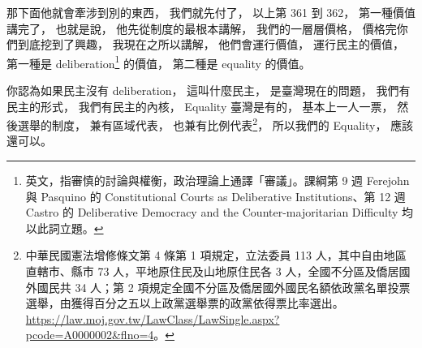 \hypertarget{w06:cue:1483}{}那下面他就會牽涉到別的東西，
\hypertarget{w06:cue:1484}{}我們就先付了，
\hypertarget{w06:cue:1485}{}以上第 361 到 362，
\hypertarget{w06:cue:1486}{}第一種價值講完了，
\hypertarget{w06:cue:1487}{}也就是說，
\hypertarget{w06:cue:1488}{}他先從制度的最根本講解，
\hypertarget{w06:cue:1489}{}我們的一層層價格，
\hypertarget{w06:cue:1490}{}價格完你們到底挖到了興趣，
\hypertarget{w06:cue:1491}{}我現在之所以講解，
\hypertarget{w06:cue:1492}{}他們會運行價值，
\hypertarget{w06:cue:1493}{}運行民主的價值，
\hypertarget{w06:cue:1494}{}第一種是 deliberation\footnote{英文，指審慎的討論與權衡，政治理論上通譯「審議」。課綱第 9 週 Ferejohn 與 Pasquino 的 Constitutional Courts as Deliberative Institutions、第 12 週 Castro 的 Deliberative Democracy and the Counter-majoritarian Difficulty 均以此詞立題。} 的價值，
\hypertarget{w06:cue:1495}{}第二種是 equality 的價值。

\hypertarget{w06:cue:1496}{}你認為如果民主沒有 deliberation，
\hypertarget{w06:cue:1497}{}這叫什麼民主，
\hypertarget{w06:cue:1498}{}是臺灣現在的問題，
\hypertarget{w06:cue:1499}{}我們有民主的形式，
\hypertarget{w06:cue:1500}{}我們有民主的內核，
\hypertarget{w06:cue:1501}{}Equality 臺灣是有的，
\hypertarget{w06:cue:1502}{}基本上一人一票，
\hypertarget{w06:cue:1503}{}然後選舉的制度，
\hypertarget{w06:cue:1504}{}兼有區域代表，
\hypertarget{w06:cue:1505}{}也兼有比例代表\footnote{中華民國憲法增修條文第 4 條第 1 項規定，立法委員 113 人，其中自由地區直轄市、縣市 73 人，平地原住民及山地原住民各 3 人，全國不分區及僑居國外國民共 34 人；第 2 項規定全國不分區及僑居國外國民名額依政黨名單投票選舉，由獲得百分之五以上政黨選舉票的政黨依得票比率選出。\url{https://law.moj.gov.tw/LawClass/LawSingle.aspx?pcode=A0000002&flno=4}。}，
\hypertarget{w06:cue:1506}{}所以我們的 Equality，
\hypertarget{w06:cue:1507}{}應該還可以。

